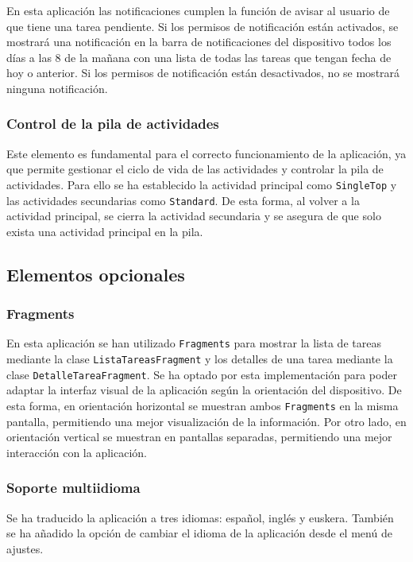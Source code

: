 \documentclass{article}
\begin{document}
En esta aplicación las notificaciones cumplen la función de avisar al usuario de que tiene una tarea pendiente. Si los permisos de notificación están activados, se mostrará una notificación en la barra de notificaciones del dispositivo todos los días a las 8 de la mañana con una lista de todas las tareas que tengan fecha de hoy o anterior. Si los permisos de notificación están desactivados, no se mostrará ninguna notificación.

\subsubsection{Control de la pila de actividades}

Este elemento es fundamental para el correcto funcionamiento de la aplicación, ya que permite gestionar el ciclo de vida de las actividades y controlar la pila de actividades. Para ello se ha establecido la actividad principal como \texttt{SingleTop} y las actividades secundarias como \texttt{Standard}. De esta forma, al volver a la actividad principal, se cierra la actividad secundaria y se asegura de que solo exista una actividad principal en la pila.

\subsection{Elementos opcionales}

\subsubsection{Fragments}

En esta aplicación se han utilizado \texttt{Fragments} para mostrar la lista de tareas mediante la clase \texttt{ListaTareasFragment} y los detalles de una tarea mediante la clase \texttt{DetalleTareaFragment}. Se ha optado por esta implementación para poder adaptar la interfaz visual de la aplicación según la orientación del dispositivo. De esta forma, en orientación horizontal se muestran ambos \texttt{Fragments} en la misma pantalla, permitiendo una mejor visualización de la información. Por otro lado, en orientación vertical se muestran en pantallas separadas, permitiendo una mejor interacción con la aplicación.

\subsubsection{Soporte multiidioma}

Se ha traducido la aplicación a tres idiomas: español, inglés y euskera. También se ha añadido la opción de cambiar el idioma de la aplicación desde el menú de ajustes.
\end{document}
